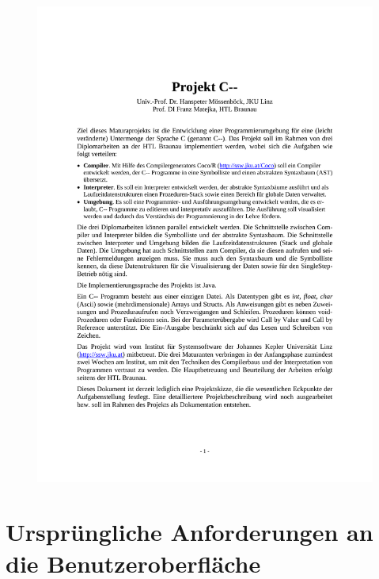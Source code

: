 \documentclass[11pt, oneside]{book}   		%
\begin{document}
\begin{figure}[h!]
	\centering
	\includegraphics[width=1.0\textwidth]{./media/docs/Anforderung-compiler.pdf}
\end{figure}



\pagebreak

\section{Ursprüngliche Anforderungen an die Benutzeroberfläche}
\label{app:anf-gui}
\end{document}
